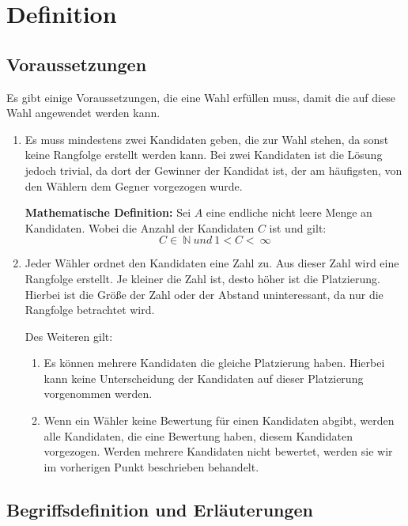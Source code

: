 
\newpage
\section{Definition}
\label{sec:definition}


\subsection{Voraussetzungen} 
\label{sec:voraussetzungen}
Es gibt einige Voraussetzungen, die eine Wahl erfüllen muss, damit die \schulze auf diese Wahl angewendet werden kann.

\begin{enumerate}
\item Es muss mindestens zwei Kandidaten geben, die zur Wahl stehen, da sonst keine Rangfolge erstellt werden kann. Bei zwei Kandidaten ist die Lösung jedoch trivial, da dort der Gewinner der Kandidat ist, der am häufigsten, von den Wählern dem Gegner vorgezogen wurde.

\textbf{Mathematische Definition:}
Sei $A$ eine endliche nicht leere Menge an Kandidaten. Wobei die Anzahl der Kandidaten $C$ ist und gilt: 
\[
  C \in\ \mathbb{N}\  und \ 1 < C <\ \infty
\]

\item Jeder Wähler ordnet den Kandidaten eine Zahl zu. Aus dieser Zahl wird eine Rangfolge erstellt. Je kleiner die Zahl ist, desto höher ist die Platzierung. Hierbei ist die Größe der Zahl oder der Abstand uninteressant, da nur die Rangfolge betrachtet wird.

Des Weiteren gilt:
\begin{enumerate}
\item \label{itm:Regel1} Es können mehrere Kandidaten die gleiche Platzierung haben. Hierbei kann keine Unterscheidung der Kandidaten auf dieser Platzierung vorgenommen werden.
\item Wenn ein Wähler keine Bewertung für einen Kandidaten abgibt, werden alle Kandidaten, die eine Bewertung haben, diesem Kandidaten vorgezogen. Werden mehrere Kandidaten nicht bewertet, werden sie wir im vorherigen Punkt beschrieben behandelt.
\end{enumerate}
\end{enumerate}

\subsection{Begriffsdefinition und Erläuterungen } 
\label{sec:begriffsdefinition}

